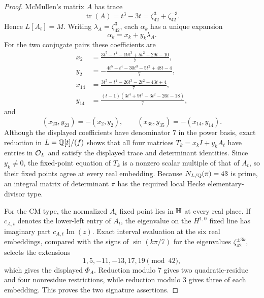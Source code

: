 \begin{proof}
McMullen's matrix $A$ has trace
\[
 \operatorname{tr}(A)=t^3-3t=\zeta_{42}^3+\zeta_{42}^{-3}.
\]
Hence $L[A_t]=M$.  Writing $\lambda_A=\zeta_{42}^3$, each $\alpha_k$ has a unique expansion
\[
 \alpha_k=x_k+y_k\lambda_A.
\]
For the two conjugate pairs these coefficients are
\[
\begin{aligned}
 x_2&=\frac{3t^5-t^4-19t^3+5t^2+29t-10}{7},\\
 y_2&=-\frac{4t^5+t^4-30t^3-5t^2+48t-4}{7},\\
 x_{14}&=\frac{3t^5-t^4-26t^3-2t^2+43t+4}{7},\\
 y_{14}&=\frac{(t-1)(3t^4+9t^3-3t^2-26t-18)}{7},
\end{aligned}
\]
and
\[
 (x_{23},y_{23})=-(x_2,y_2),\qquad
 (x_{35},y_{35})=-(x_{14},y_{14}).
\]
Although the displayed coefficients have denominator $7$ in the power basis, exact reduction in $L=\mathbb Q[t]/(f)$ shows that all four matrices $T_k=x_kI+y_kA_t$ have entries in $\mathcal O_L$ and satisfy the displayed trace and determinant identities.  Since $y_k\ne0$, the fixed-point equation of $T_k$ is a nonzero scalar multiple of that of $A_t$, so their fixed points agree at every real embedding.  Because $N_{L/\mathbb Q}(\pi)=43$ is prime, an integral matrix of determinant $\pi$ has the required local Hecke elementary-divisor type.

For the CM type, the normalized $A_t$ fixed point lies in $\mathbb H$ at every real place.  If $c_{A,t}$ denotes the lower-left entry of $A_t$, the eigenvalue on the $H^{1,0}$ fixed line has imaginary part $c_{A,t}\operatorname{Im}(z)$.  Exact interval evaluation at the six real embeddings, compared with the signs of $\sin(k\pi/7)$ for the eigenvalues $\zeta_{42}^{\pm3k}$, selects the extensions
\[
 1,5,-11,-13,17,19\pmod{42},
\]
which gives the displayed $\Phi_A$.  Reduction modulo $7$ gives two quadratic-residue and four nonresidue restrictions, while reduction modulo $3$ gives three of each embedding.  This proves the two signature assertions.
\end{proof}

